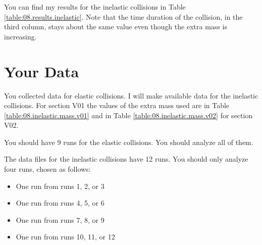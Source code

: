 You can find my results for the inelastic collisions in Table \ref{table:08.results.inelastic}. Note that the time duration of the collision, in the third column, stays about the same value even though the extra mass is increasing.
\section{Your Data}
You collected data for elastic collisions. I will make available data for the inelastic collisions. For section V01 the values of the extra mass used are in Table \ref{table:08.inelastic.mass.v01} and in Table \ref{table:08.inelastic.mass.v02} for section V02.

You should have 9 runs for the elastic collisions. You should analyze all of them.

The data files for the inelastic collisions have 12 runs. You should only analyze four runs, chosen as follows:
\begin{itemize}
    \item One run from runs 1, 2, or 3
    \item One run from runs 4, 5, or 6
    \item One run from runs 7, 8, or 9
    \item One run from runs 10, 11, or 12
\end{itemize}
\newpage
